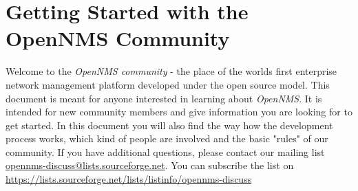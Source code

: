 \section{Getting Started with the OpenNMS Community}
Welcome to the \emph{OpenNMS community} - the place of the worlds first enterprise network management platform developed under the open source model. This document is meant for anyone interested in learning about \emph{OpenNMS}. It is intended for new community members and give information you are looking for to get started. In this document you will also find the way how the development process works, which kind of people are involved and the basic "rules" of our community. If you have additional questions, please contact our mailing list \url{opennms-discuss@lists.sourceforge.net}. You can subscribe the list on \url{https://lists.sourceforge.net/lists/listinfo/opennms-discuss}
